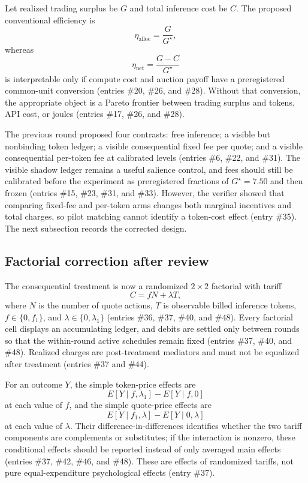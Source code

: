 \documentclass{article}
\begin{document}
Let realized trading surplus be \(G\) and total inference cost be \(C\).  The proposed conventional efficiency is
\[
\eta_{\mathrm{alloc}}=\frac{G}{G^{\star}},
\]
whereas
\[
\eta_{\mathrm{net}}=\frac{G-C}{G^{\star}}
\]
is interpretable only if compute cost and auction payoff have a preregistered common-unit conversion (entries \#20, \#26, and \#28).  Without that conversion, the appropriate object is a Pareto frontier between trading surplus and tokens, API cost, or joules (entries \#17, \#26, and \#28).

The previous round proposed four contrasts: free inference; a visible but nonbinding token ledger; a visible consequential fixed fee per quote; and a visible consequential per-token fee at calibrated levels (entries \#6, \#22, and \#31).  The visible shadow ledger remains a useful salience control, and fees should still be calibrated before the experiment as preregistered fractions of \(G^{\star}=7.50\) and then frozen (entries \#15, \#23, \#31, and \#33).  However, the verifier showed that comparing fixed-fee and per-token arms changes both marginal incentives and total charges, so pilot matching cannot identify a token-cost effect (entry \#35).  The next subsection records the corrected design.

\subsection{Factorial correction after review}
The consequential treatment is now a randomized \(2\times2\) factorial with tariff
\[
C=fN+\lambda T,
\]
where \(N\) is the number of quote actions, \(T\) is observable billed inference tokens, \(f\in\{0,f_1\}\), and \(\lambda\in\{0,\lambda_1\}\) (entries \#36, \#37, \#40, and \#48).  Every factorial cell displays an accumulating ledger, and debits are settled only between rounds so that the within-round active schedules remain fixed (entries \#37, \#40, and \#48).  Realized charges are post-treatment mediators and must not be equalized after treatment (entries \#37 and \#44).

For an outcome \(Y\), the simple token-price effects are
\[
E[Y\mid f,\lambda_1]-E[Y\mid f,0]
\]
at each value of \(f\), and the simple quote-price effects are
\[
E[Y\mid f_1,\lambda]-E[Y\mid 0,\lambda]
\]
at each value of \(\lambda\).  Their difference-in-differences identifies whether the two tariff components are complements or substitutes; if the interaction is nonzero, these conditional effects should be reported instead of only averaged main effects (entries \#37, \#42, \#46, and \#48).  These are effects of randomized tariffs, not pure equal-expenditure psychological effects (entry \#37).
\end{document}
